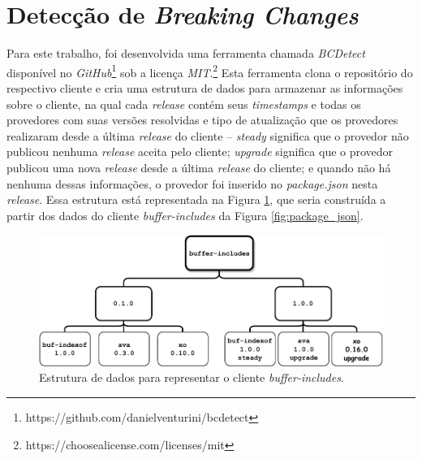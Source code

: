 \section{Detecção de \textit{Breaking Changes}}
\label{sec:bcdetect}
Para este trabalho, foi desenvolvida uma ferramenta chamada \textit{BCDetect} disponível no \textit{GitHub}\footnote{https://github.com/danielventurini/bcdetect} sob a licença \textit{MIT}.\footnote{https://choosealicense.com/licenses/mit} Esta ferramenta clona o repositório do respectivo cliente e cria uma estrutura de dados para armazenar as informações sobre o cliente, na qual cada \textit{release} contém seus \textit{timestamps} e todas os provedores com suas versões resolvidas e tipo de atualização que os provedores realizaram desde a última \textit{release} do cliente -- \textit{steady} significa que o provedor não publicou nenhuma \textit{release} aceita pelo cliente; \textit{upgrade} significa que o provedor publicou uma nova \textit{release} desde a última \textit{release} do cliente; e quando não há nenhuma dessas informações, o provedor foi inserido no \textit{package.json} nesta \textit{release}. Essa estrutura está representada na Figura \ref{fig:bc_work}, que seria construída a partir dos dados do cliente \textit{buffer-includes} da Figura \ref{fig:package_json}.

\begin{figure}
    \centering
    \includegraphics[scale=0.9]{figuras/bcdetect_work.pdf}
    \caption{Estrutura de dados para representar o cliente \textit{buffer-includes}.}
    \label{fig:bc_work}
\end{figure}{}

